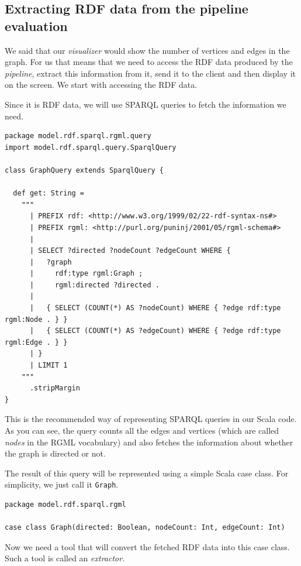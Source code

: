 \subsection{Extracting RDF data from the pipeline evaluation}
\label{sec:implementation:integrating-visualizer:extracting-rdf}

We said that our \emph{visualizer} would show the number of vertices and edges in the graph. For us that means that we need to access the RDF data produced by the \emph{pipeline}, extract this information from it, send it to the client and then display it on the screen. We start with accessing the RDF data.

Since it is RDF data, we will use SPARQL queries to fetch the information we need. 

\begin{verbatim}
package model.rdf.sparql.rgml.query
import model.rdf.sparql.query.SparqlQuery

class GraphQuery extends SparqlQuery {

  def get: String =
    """
      | PREFIX rdf: <http://www.w3.org/1999/02/22-rdf-syntax-ns#>
      | PREFIX rgml: <http://purl.org/puninj/2001/05/rgml-schema#>
      |
      | SELECT ?directed ?nodeCount ?edgeCount WHERE {
      |   ?graph
      |     rdf:type rgml:Graph ;
      |     rgml:directed ?directed .
      |
      |   { SELECT (COUNT(*) AS ?nodeCount) WHERE { ?edge rdf:type rgml:Node . } }
      |   { SELECT (COUNT(*) AS ?edgeCount) WHERE { ?edge rdf:type rgml:Edge . } }
      | }
      | LIMIT 1
    """
      .stripMargin
}
\end{verbatim}

This is the recommended way of representing SPARQL queries in our Scala code. As you can see, the query counts all the edges and vertices (which are called \emph{nodes} in the RGML vocabulary) and also fetches the information about whether the graph is directed or not.

The result of this query will be represented using a simple Scala case class. For simplicity, we just call it \texttt{Graph}.

\begin{verbatim}
package model.rdf.sparql.rgml

case class Graph(directed: Boolean, nodeCount: Int, edgeCount: Int)
\end{verbatim}

Now we need a tool that will convert the fetched RDF data into this case class. Such a tool is called an \emph{extractor}.

